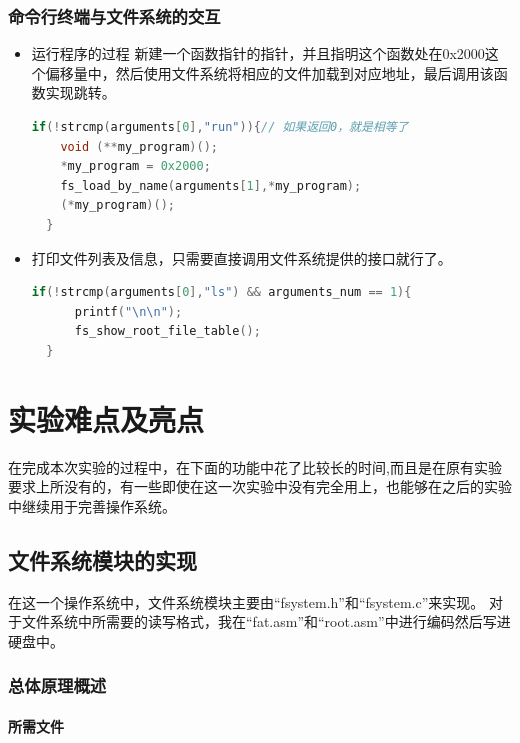 \documentclass[forprint]{WHUBachelor}
\begin{document}
\subsection{命令行终端与文件系统的交互}

\begin{itemize}
  \item 运行程序的过程
  新建一个函数指针的指针，并且指明这个函数处在0x2000这个偏移量中，然后使用文件系统将相应的文件加载到对应地址，最后调用该函数实现跳转。
  \begin{lstlisting}[language=c]
   if(!strcmp(arguments[0],"run")){// 如果返回0，就是相等了
    void (**my_program)();
    *my_program = 0x2000;
    fs_load_by_name(arguments[1],*my_program);
    (*my_program)();
  }
  \end{lstlisting}
  \item 打印文件列表及信息，只需要直接调用文件系统提供的接口就行了。
  \begin{lstlisting}[language=c]
  if(!strcmp(arguments[0],"ls") && arguments_num == 1){
      printf("\n\n");
      fs_show_root_file_table();
  }
  \end{lstlisting}
\end{itemize}

\chapter{实验难点及亮点}

在完成本次实验的过程中，在下面的功能中花了比较长的时间,而且是在原有实验要求上所没有的，有一些即使在这一次实验中没有完全用上，也能够在之后的实验中继续用于完善操作系统。

\section{文件系统模块的实现}

在这一个操作系统中，文件系统模块主要由“fsystem.h”和“fsystem.c”来实现。
对于文件系统中所需要的读写格式，我在“fat.asm”和“root.asm”中进行编码然后写进硬盘中。

\subsection{总体原理概述}

\subsubsection{所需文件}
\end{document}
